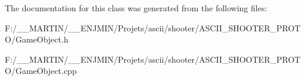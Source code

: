 The documentation for this class was generated from the following files\+:\begin{DoxyCompactItemize}
\item 
F\+:/\+\_\+\+\_\+\+M\+A\+R\+T\+I\+N/\+\_\+\+\_\+\+E\+N\+J\+M\+I\+N/\+Projets/ascii/shooter/\+A\+S\+C\+I\+I\+\_\+\+S\+H\+O\+O\+T\+E\+R\+\_\+\+P\+R\+O\+T\+O/Game\+Object.\+h\item 
F\+:/\+\_\+\+\_\+\+M\+A\+R\+T\+I\+N/\+\_\+\+\_\+\+E\+N\+J\+M\+I\+N/\+Projets/ascii/shooter/\+A\+S\+C\+I\+I\+\_\+\+S\+H\+O\+O\+T\+E\+R\+\_\+\+P\+R\+O\+T\+O/Game\+Object.\+cpp\end{DoxyCompactItemize}
